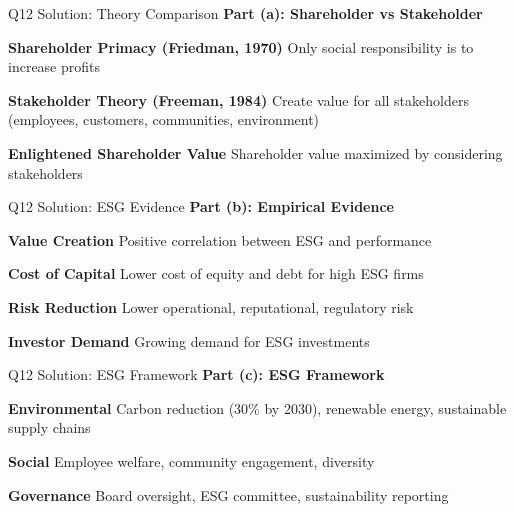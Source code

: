 \documentclass[aspectratio=169,10pt]{beamer}
\renewcommand{\small}{\fontsize{6pt}{7.5pt}\selectfont}
\renewcommand{\large}{\fontsize{8pt}{10pt}\selectfont}
\newcommand{\question}[1]{{\large\bfseries\color{crimson}#1}}
\begin{document}
	\begin{frame}{Q12 Solution: Theory Comparison}
		\question{Part (a): Shareholder vs Stakeholder}
		\small
		
		\textbf{Shareholder Primacy (Friedman, 1970)}
		Only social responsibility is to increase profits
		
		\vspace{0.1cm}
		\textbf{Stakeholder Theory (Freeman, 1984)}
		Create value for all stakeholders (employees, customers, communities, environment)
		
		\vspace{0.1cm}
		\textbf{Enlightened Shareholder Value}
		Shareholder value maximized by considering stakeholders
	\end{frame}
	
	\begin{frame}{Q12 Solution: ESG Evidence}
		\question{Part (b): Empirical Evidence}
		\small
		
		\textbf{Value Creation}
		Positive correlation between ESG and performance
		
		\vspace{0.1cm}
		\textbf{Cost of Capital}
		Lower cost of equity and debt for high ESG firms
		
		\vspace{0.1cm}
		\textbf{Risk Reduction}
		Lower operational, reputational, regulatory risk
		
		\vspace{0.1cm}
		\textbf{Investor Demand}
		Growing demand for ESG investments
	\end{frame}
	
	\begin{frame}{Q12 Solution: ESG Framework}
		\question{Part (c): ESG Framework}
		\small
		
		\textbf{Environmental}
		Carbon reduction (30\% by 2030), renewable energy, sustainable supply chains
		
		\vspace{0.1cm}
		\textbf{Social}
		Employee welfare, community engagement, diversity
		
		\vspace{0.1cm}
		\textbf{Governance}
		Board oversight, ESG committee, sustainability reporting
	\end{frame}
	
\end{document}
